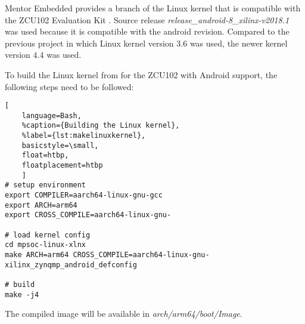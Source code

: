 Mentor Embedded provides a branch of the Linux kernel that is compatible with the ZCU102 Evaluation Kit \cite{linuxkernel}.
Source release \emph{release_android-8_xilinx-v2018.1} was used because it is compatible with the android revision. Compared to the previous project \cite{oldrepo} in which Linux kernel version $3.6$ was used, the newer kernel version $4.4$ was used.

To build the Linux kernel from \cite{linuxkernel} for the ZCU102 with Android support,
the following steps need to be followed:
\begin{lstlisting}[
	language=Bash,
	%caption={Building the Linux kernel},
	%label={lst:makelinuxkernel},
	basicstyle=\small,
	float=htbp,
	floatplacement=htbp
	]
# setup environment
export COMPILER=aarch64-linux-gnu-gcc
export ARCH=arm64
export CROSS_COMPILE=aarch64-linux-gnu-	

# load kernel config
cd mpsoc-linux-xlnx
make ARCH=arm64 CROSS_COMPILE=aarch64-linux-gnu- xilinx_zynqmp_android_defconfig

# build
make -j4
\end{lstlisting}
\FloatBarrier

The compiled image will be available in \emph{arch/arm64/boot/Image}.
